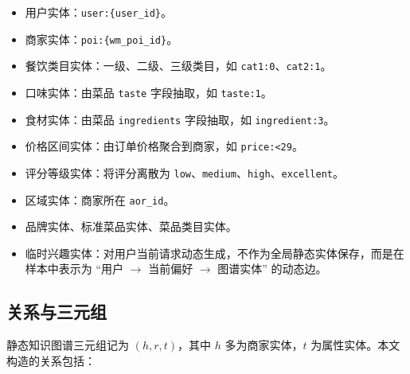 \documentclass[UTF8,a4paper,12pt]{ctexart}
\begin{document}
\begin{itemize}
  \item 用户实体：\texttt{user:\{user\_id\}}。
  \item 商家实体：\texttt{poi:\{wm\_poi\_id\}}。
  \item 餐饮类目实体：一级、二级、三级类目，如 \texttt{cat1:0}、\texttt{cat2:1}。
  \item 口味实体：由菜品 \texttt{taste} 字段抽取，如 \texttt{taste:1}。
  \item 食材实体：由菜品 \texttt{ingredients} 字段抽取，如 \texttt{ingredient:3}。
  \item 价格区间实体：由订单价格聚合到商家，如 \texttt{price:<29}。
  \item 评分等级实体：将评分离散为 \texttt{low}、\texttt{medium}、\texttt{high}、\texttt{excellent}。
  \item 区域实体：商家所在 \texttt{aor\_id}。
  \item 品牌实体、标准菜品实体、菜品类目实体。
  \item 临时兴趣实体：对用户当前请求动态生成，不作为全局静态实体保存，而是在样本中表示为 ``用户 $\rightarrow$ 当前偏好 $\rightarrow$ 图谱实体'' 的动态边。
\end{itemize}

\subsection{关系与三元组}

静态知识图谱三元组记为 $(h,r,t)$，其中 $h$ 多为商家实体，$t$ 为属性实体。本文构造的关系包括：
\end{document}
